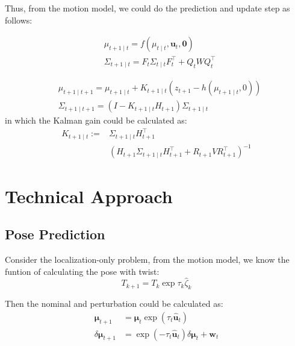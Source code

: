 \documentclass[conference]{IEEEtran}
\begin{document}
Thus, from the motion model, we could do the prediction and update step as follows:


\begin{equation}
    \begin{aligned}
    & \mu_{t+1 \mid t}=f\left(\mu_{t \mid t}, \mathbf{u}_t, \mathbf{0}\right) \\
    & \Sigma_{t+1 \mid t}=F_t \Sigma_{t \mid t} F_t^{\top}+Q_t W Q_t^{\top} 
    \end{aligned}
\end{equation}

\begin{equation}
    \begin{aligned}
    & \mu_{t+1 \mid t+1}=\mu_{t+1 \mid t}+K_{t+1 \mid t}\left(z_{t+1}-h\left(\mu_{t+1 \mid t}, 0\right)\right) \\
    & \Sigma_{t+1 \mid t+1}=\left(I-K_{t+1 \mid t} H_{t+1}\right) \Sigma_{t+1 \mid t}
    \end{aligned}
\end{equation}
in which the Kalman gain could be calculated as:
\begin{equation}
    \begin{aligned}
    K_{t+1 \mid t}:=&\Sigma_{t+1 \mid t} H_{t+1}^{\top} \\ &\left(H_{t+1} \Sigma_{t+1 \mid t} H_{t+1}^{\top}+R_{t+1} V R_{t+1}^{\top}\right)^{-1}
    \end{aligned}
\end{equation}



\section{Technical Approach}
\subsection{Pose Prediction}
Consider the localization-only problem, from the motion model, we know the funtion of calculating the pose with twist:
\begin{equation}
T_{k+1} = T_k\exp{\tau_k\hat{\zeta}_k}
\end{equation}

Then the nominal and perturbation could be calculated as:
\begin{equation}
    \begin{aligned}
    \boldsymbol{\mu}_{t+1} & =\boldsymbol{\mu}_t \exp \left(\tau_t \hat{\mathbf{u}}_t\right) \\
    \delta \boldsymbol{\mu}_{t+1} & =\exp \left(-\tau_t \hat{\mathbf{u}}_t\right) \delta \boldsymbol{\mu}_t+\mathbf{w}_t
    \end{aligned}
\end{equation}
\end{document}

